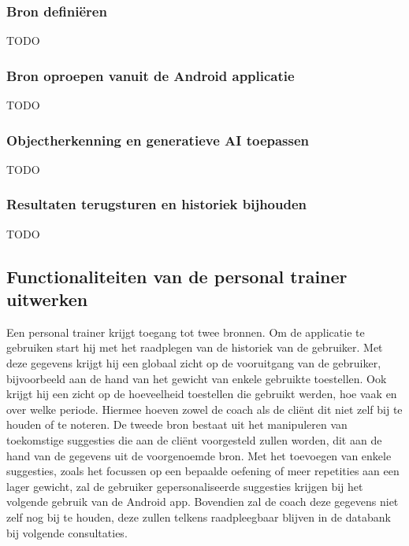 \subsubsection{Bron definiëren}
TODO %

\subsubsection{Bron oproepen vanuit de Android applicatie}
TODO %

\subsubsection{Objectherkenning en generatieve AI toepassen}
TODO %

\subsubsection{Resultaten terugsturen en historiek bijhouden}
TODO %

\subsection{Functionaliteiten van de personal trainer uitwerken}
\label{subsec:functionaliteiten-van-de-personal-trainer-uitwerken}
Een personal trainer krijgt toegang tot twee bronnen.
Om de applicatie te gebruiken start hij met het raadplegen van de historiek van de gebruiker.
Met deze gegevens krijgt hij een globaal zicht op de vooruitgang van de gebruiker, bijvoorbeeld aan de hand van het gewicht van enkele gebruikte toestellen.
Ook krijgt hij een zicht op de hoeveelheid toestellen die gebruikt werden, hoe vaak en over welke periode.
Hiermee hoeven zowel de coach als de cliënt dit niet zelf bij te houden of te noteren.
De tweede bron bestaat uit het manipuleren van toekomstige suggesties die aan de cliënt voorgesteld zullen worden, dit aan de hand van de gegevens uit de voorgenoemde bron.
Met het toevoegen van enkele suggesties, zoals het focussen op een bepaalde oefening of meer repetities aan een lager gewicht, zal de gebruiker gepersonaliseerde suggesties krijgen bij het volgende gebruik van de Android app.
Bovendien zal de coach deze gegevens niet zelf nog bij te houden, deze zullen telkens raadpleegbaar blijven in de databank bij volgende consultaties.

